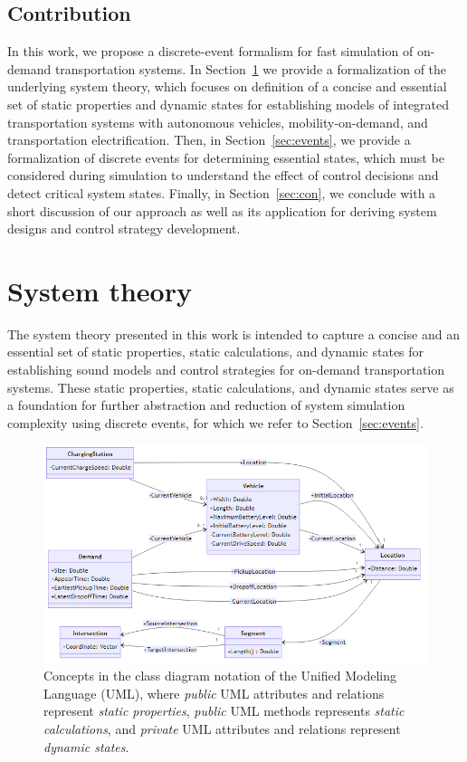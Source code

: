 \documentclass[graybox]{svmult}
\begin{document}
\subsection{Contribution}

In this work, we propose a discrete-event formalism for fast simulation of on-demand transportation systems.
In Section~\ref{sec:theory} we provide a formalization of the underlying system theory, which focuses on definition of a concise and essential set of static properties and dynamic states for establishing models of integrated transportation systems with autonomous vehicles, mobility-on-demand, and transportation electrification.
Then, in Section~\ref{sec:events}, we provide a formalization of discrete events for determining essential states, which must be considered during simulation to understand the effect of control decisions and detect critical system states.
Finally, in Section~\ref{sec:con}, we conclude with a short discussion of our approach as well as its application for deriving system designs and control strategy development.

\section{System theory}
\label{sec:theory}

The system theory presented in this work is intended to capture a concise and an essential set of static properties, static calculations, and dynamic states for establishing sound models and control strategies for on-demand transportation systems.
These static properties, static calculations, and dynamic states serve as a foundation for further abstraction and reduction of system simulation complexity using discrete events, for which we refer to Section~\ref{sec:events}.

\begin{figure}[htbp]
	\centering
	\includegraphics[width=\textwidth]{./graphics/data-model.png}
	\caption{Concepts in the class diagram notation of the Unified Modeling Language (UML), where \textit{public} UML attributes and relations represent \textit{static properties}, \textit{public} UML methods represents \textit{static calculations}, and \textit{private} UML attributes and relations represent \textit{dynamic states}.}
	\label{fig:concepts}
\end{figure}
\end{document}
